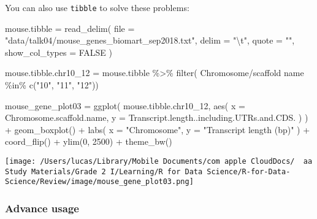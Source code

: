 \documentclass[
]{article}
\newenvironment{Shaded}{}{}
\newcommand{\AttributeTok}[1]{\textcolor[rgb]{0.49,0.56,0.16}{#1}}
\newcommand{\ConstantTok}[1]{\textcolor[rgb]{0.53,0.00,0.00}{#1}}
\newcommand{\DecValTok}[1]{\textcolor[rgb]{0.25,0.63,0.44}{#1}}
\newcommand{\FunctionTok}[1]{\textcolor[rgb]{0.02,0.16,0.49}{#1}}
\newcommand{\NormalTok}[1]{#1}
\newcommand{\OtherTok}[1]{\textcolor[rgb]{0.00,0.44,0.13}{#1}}
\newcommand{\SpecialCharTok}[1]{\textcolor[rgb]{0.25,0.44,0.63}{#1}}
\newcommand{\StringTok}[1]{\textcolor[rgb]{0.25,0.44,0.63}{#1}}
\begin{document}
You can also use \texttt{tibble} to solve these problems:

\begin{Shaded}
\begin{Highlighting}[]
\NormalTok{mouse.tibble }\OtherTok{=}
  \FunctionTok{read\_delim}\NormalTok{(}
    \AttributeTok{file =} \StringTok{"data/talk04/mouse\_genes\_biomart\_sep2018.txt"}\NormalTok{,}
    \AttributeTok{delim =} \StringTok{"}\SpecialCharTok{\textbackslash{}t}\StringTok{"}\NormalTok{,}
    \AttributeTok{quote =} \StringTok{""}\NormalTok{,}
    \AttributeTok{show\_col\_types =} \ConstantTok{FALSE}
\NormalTok{  )}

\NormalTok{mouse.tibble.chr10\_12 }\OtherTok{=}
\NormalTok{  mouse.tibble }\SpecialCharTok{\%\textgreater{}\%} \FunctionTok{filter}\NormalTok{(}
    \StringTok{\textasciigrave{}}\AttributeTok{Chromosome/scaffold name}\StringTok{\textasciigrave{}} \SpecialCharTok{\%in\%} \FunctionTok{c}\NormalTok{(}\StringTok{"10"}\NormalTok{, }\StringTok{"11"}\NormalTok{, }\StringTok{"12"}\NormalTok{))}


\NormalTok{mouse\_gene\_plot03 }\OtherTok{=}
    \FunctionTok{ggplot}\NormalTok{(}
\NormalTok{        mouse.tibble.chr10\_12,}
        \FunctionTok{aes}\NormalTok{(}
        \AttributeTok{x =}\NormalTok{ Chromosome.scaffold.name,}
        \AttributeTok{y =}\NormalTok{ Transcript.length..including.UTRs.and.CDS.}
\NormalTok{        )}
\NormalTok{    ) }\SpecialCharTok{+}
    \FunctionTok{geom\_boxplot}\NormalTok{() }\SpecialCharTok{+}
    \FunctionTok{labs}\NormalTok{(}
        \AttributeTok{x =} \StringTok{"Chromosome"}\NormalTok{,}
        \AttributeTok{y =} \StringTok{"Transcript length (bp)"}
\NormalTok{    ) }\SpecialCharTok{+}
    \FunctionTok{coord\_flip}\NormalTok{() }\SpecialCharTok{+}
    \FunctionTok{ylim}\NormalTok{(}\DecValTok{0}\NormalTok{, }\DecValTok{2500}\NormalTok{) }\SpecialCharTok{+}
    \FunctionTok{theme\_bw}\NormalTok{()}
\end{Highlighting}
\end{Shaded}

\texttt{[image: /Users/lucas/Library/Mobile Documents/com~apple~CloudDocs/~~aa Study Materials/Grade 2 I/Learning/R for Data Science/R-for-Data-Science/Review/image/mouse\_gene\_plot03.png]}

\hypertarget{advance-usage}{%
\subsubsection{Advance usage}\label{advance-usage}}
\end{document}
